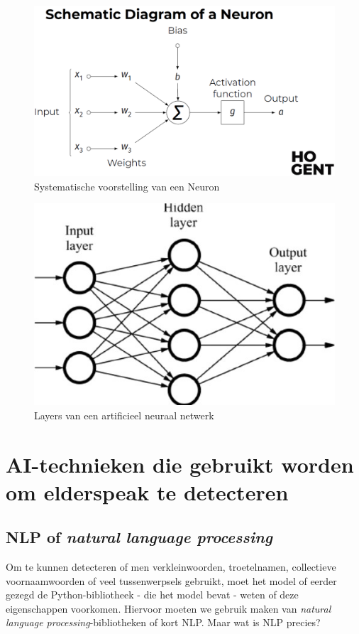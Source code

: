\begin{figure}
    \centering
    \includegraphics[width=1\textwidth]{./img/neuron}
    \caption{\label{fig:neuron} Systematische voorstelling van een Neuron~\autocite{Lievens2021}}
\end{figure}

\begin{figure}
    \centering
    \includegraphics[width=.5\textwidth]{./img/layers}
    \caption{\label{fig:layers} Layers van een artificieel neuraal netwerk~\autocite{Lievens2021}}
\end{figure}


\section{AI-technieken die gebruikt worden om elderspeak te detecteren}

\subsection{NLP of \textit{natural language processing}}
Om te kunnen detecteren of men verkleinwoorden, troetelnamen, collectieve voornaamwoorden of veel tussenwerpsels gebruikt, moet het model of eerder gezegd de Python-bibliotheek - die het model bevat - weten of deze eigenschappen voorkomen. Hiervoor moeten we gebruik maken van \textit{natural language processing}-bibliotheken of kort NLP. Maar wat is NLP precies?

